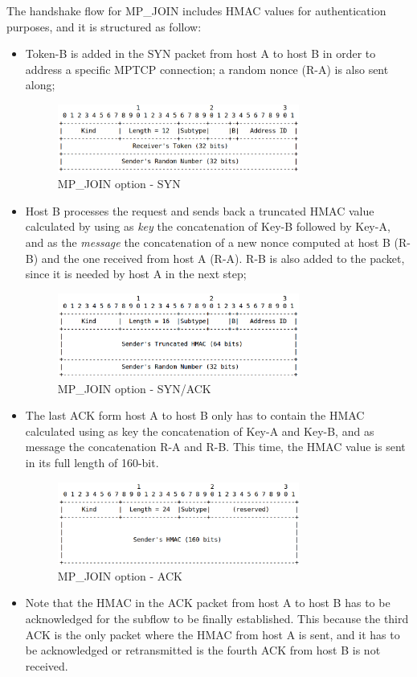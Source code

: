 The handshake flow for MP\_JOIN includes HMAC values for authentication purposes, and it is structured as follow:
\begin{itemize}
  \item Token-B is added in the SYN packet from host A to host B in order to address a specific MPTCP connection; a random nonce (R-A) is also sent along;
  \begin{figure}[!htb]
\centering
\includegraphics[width=0.75\textwidth]{images/opt_join1}
\caption{MP\_JOIN option - SYN}
\label{fig:opt_join1}
\end{figure}
  \item Host B processes the request and sends back a truncated HMAC value calculated by using as \textit{key} the concatenation of Key-B followed by Key-A, and as the \textit{message} the concatenation of a new nonce computed at host B (R-B) and the one received from host A (R-A). R-B is also added to the packet, since it is needed by host A in the next step;
\begin{figure}[!htb]
\centering
\includegraphics[width=0.75\textwidth]{images/opt_join2}
\caption{MP\_JOIN option - SYN/ACK}
\label{fig:opt_join2}
\end{figure}
  \item The last ACK form host A to host B only has to contain the HMAC calculated using as key the concatenation of Key-A and Key-B, and as message the concatenation R-A and R-B. This time, the HMAC value is sent in its full length of 160-bit.
\begin{figure}[!htb]
\centering
\includegraphics[width=0.75\textwidth]{images/opt_join3}
\caption{MP\_JOIN option - ACK}
\label{fig:opt_join3}
\end{figure}
  \item Note that the HMAC in the ACK packet from host A to host B has to be acknowledged for the subflow to be finally established. This because the third ACK is the only packet where the HMAC from host A is sent, and it has to be acknowledged or retransmitted is the fourth ACK from host B is not received.
\end{itemize}

